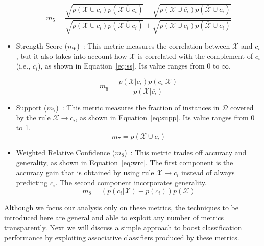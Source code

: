 \begin{itemize}
\begin{equation}
\label{eq:yulesy}
m_5=\frac{\sqrt{p(\mathcal{X}\cup c_i) p(\overline{\mathcal{X}\cup c_i})}-\sqrt{p(\mathcal{X}\cup\overline{c_i}) p(\overline{\mathcal{X}}\cup c_i)}}{\sqrt{p(\mathcal{X}\cup c_i) p(\overline{\mathcal{X}\cup c_i})}+\sqrt{p(\mathcal{X}\cup\overline{c_i}) p(\overline{\mathcal{X}}\cup c_i)}}
\end{equation}

\item Strength Score ($m_6$)~\cite{cccs}: This metric measures the correlation between $\mathcal{X}$ and $c_i$, but it also takes into account how $\mathcal{X}$ is correlated with the complement of $c_i$ (i.e., $\overline{c_i}$), as shown in Equation~\ref{eq:ss}. Its value ranges from 0 to $\infty$.

\begin{equation}
\label{eq:ss}
m_6=\frac{p(\mathcal{X}|c_i) p(c_i|\mathcal{X})}{p(\mathcal{X}|\overline{c_i})}
\end{equation}

\item Support ($m_7$)~\cite{rules}: This metric measures the fraction of instances in $\mathcal{D}$ covered by the rule $\mathcal{X}\xrightarrow{}c_i$, as shown in Equation~\ref{eq:supp}. Its value ranges from 0 to 1.
\begin{equation}
\label{eq:supp}
m_7=p(\mathcal{X}\cup c_i)
\end{equation}

\item Weighted Relative Confidence ($m_8$)~\cite{measures}: This metric trades off accuracy and generality, as shown in Equation~\ref{eq:wrc}. The first component is the accuracy gain that is obtained by using rule $\mathcal{X}\xrightarrow{}c_i$ instead of always predicting $c_i$. The second component incorporates generality.
\begin{equation}
\label{eq:wrc}
m_8=(p(c_i|\mathcal{X})-p(c_i)) p(\mathcal{X})
\end{equation}

\end{itemize}

Although we focus our analysis only on these metrics, the techniques to be introduced here are general and able to exploit any number of metrics transparently.
Next we will discuss a simple approach to boost classification performance by exploiting associative classifiers produced by these metrics.


